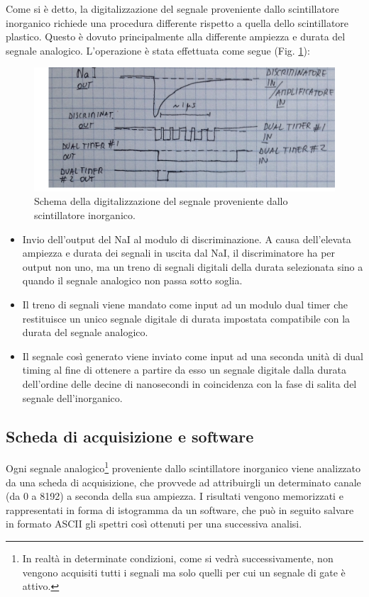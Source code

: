 \documentclass[5pt]{article}
\begin{document}
Come si è detto, la digitalizzazione del segnale proveniente dallo scintillatore inorganico richiede una procedura differente rispetto a quella dello scintillatore plastico. Questo è dovuto principalmente alla differente ampiezza e durata del segnale analogico. L'operazione è stata effettuata come segue (Fig. \ref{fig:dual_1}): \\

\begin{figure}
\begin{center}
\includegraphics[scale=0.25]{dual_1}
\caption{Schema della digitalizzazione del segnale proveniente dallo scintillatore inorganico.}
\label{fig:dual_1}
\end{center}
\end{figure}

\begin{itemize}
	\item Invio dell'output del NaI al modulo di discriminazione. A causa dell'elevata ampiezza e durata dei segnali in uscita dal NaI, il discriminatore ha per output non uno, ma un treno di segnali digitali della durata selezionata sino a quando il segnale analogico non passa sotto soglia.
	\item Il treno di segnali viene mandato come input ad un modulo dual timer che restituisce un unico segnale digitale di durata impostata compatibile con la durata del segnale analogico.
	\item Il segnale così generato viene inviato come input ad una seconda unità di dual timing al fine di ottenere a partire da esso un segnale digitale dalla durata dell'ordine delle decine di nanosecondi in coincidenza con la fase di salita del segnale dell'inorganico.
\end{itemize}

\subsection{Scheda di acquisizione e software}
Ogni segnale analogico\footnote{In realtà in determinate condizioni, come si vedrà successivamente, non vengono acquisiti tutti i segnali ma solo quelli per cui un segnale di gate è attivo.} proveniente dallo scintillatore inorganico viene analizzato da una scheda di acquisizione, che provvede ad attribuirgli un determinato canale (da 0 a 8192) a seconda della sua ampiezza. I risultati vengono memorizzati e rappresentati in forma di istogramma da un software, che può in seguito salvare in formato ASCII gli spettri così ottenuti per una successiva analisi. 
\end{document}
